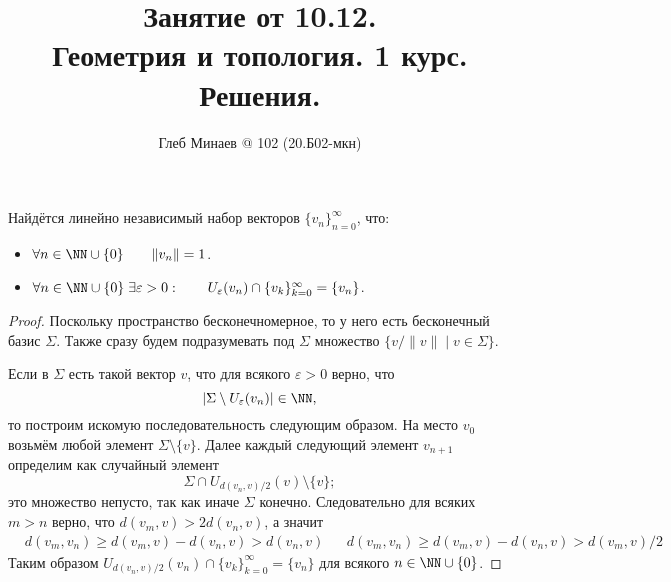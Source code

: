 \documentclass[12pt,a4paper]{article}
\title{Занятие от 10.12.\\Геометрия и топология. 1 курс.\\Решения.}
\author{Глеб Минаев @ 102 (20.Б02-мкн)}
\begin{document}
    \maketitle

    \begin{problem}{56}
        \begin{lemma}
            Найдётся линейно независимый набор векторов $\{v_n\}_{n=0}^\infty$, что:
            \begin{itemize}
                \item $\forall n \in \NN \cup \{0\}\qquad \|v_n\| = 1$.
                \item $\forall n \in \NN \cup \{0\}\; \exists \varepsilon > 0:\qquad U_{\varepsilon}(v_n) \cap \{v_k\}_{k=0}^\infty = \{v_n\}$. 
            \end{itemize}
        \end{lemma}

        \begin{proof}
            Поскольку пространство бесконечномерное, то у него есть бесконечный базис $\Sigma$. Также сразу будем подразумевать под $\Sigma$ множество $\{v/\|v\| \mid v \in \Sigma\}$.
            
            Если в $\Sigma$ есть такой вектор $v$, что для всякого $\varepsilon > 0$ верно, что
            \[|\Sigma \setminus U_{\varepsilon}(v_n)| \in \NN,\]
            то построим искомую последовательность следующим образом. На место $v_0$ возьмём любой элемент $\Sigma \setminus \{v\}$. Далее каждый следующий элемент $v_{n+1}$ определим как случайный элемент
            \[\Sigma \cap U_{d(v_n, v)/2}(v) \setminus \{v\};\]
            это множество непусто, так как иначе $\Sigma$ конечно. Следовательно для всяких $m > n$ верно, что $d(v_m, v) > 2d(v_n, v)$, а значит
            \begin{align*}
                &d(v_m, v_n) \geqslant d(v_m, v) - d(v_n, v) > d(v_n, v)&
                &d(v_m, v_n) \geqslant d(v_m, v) - d(v_n, v) > d(v_m, v)/2&
            \end{align*}
            Таким образом $U_{d(v_n, v)/2}(v_n) \cap \{v_k\}_{k=0}^\infty = \{v_n\}$ для всякого $n \in \NN \cup \{0\}$.

            
        \end{proof}
    \end{problem}
\end{document}
